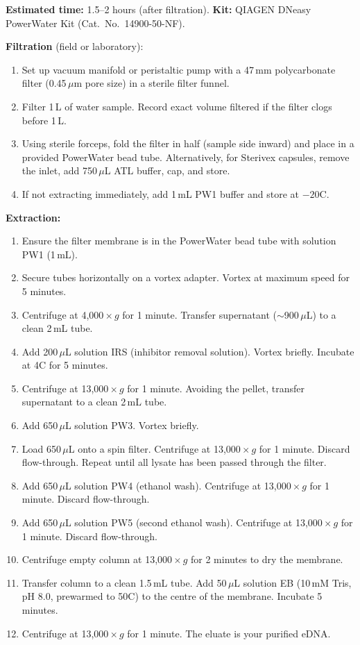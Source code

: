\begin{protocolbox}[title={Protocol: eDNA Extraction from Water (DNeasy PowerWater Kit)}]
\textbf{Estimated time:} 1.5--2 hours (after filtration). \textbf{Kit:} QIAGEN DNeasy PowerWater Kit (Cat.\ No.\ 14900-50-NF).

\textbf{Filtration} (field or laboratory):
\begin{enumerate}[nosep]
  \item Set up vacuum manifold or peristaltic pump with a 47\,mm polycarbonate filter (0.45\,$\mu$m pore size) in a sterile filter funnel.
  \item Filter 1\,L of water sample. Record exact volume filtered if the filter clogs before 1\,L.
  \item Using sterile forceps, fold the filter in half (sample side inward) and place in a provided PowerWater bead tube. Alternatively, for Sterivex capsules, remove the inlet, add 750\,$\mu$L ATL buffer, cap, and store.
  \item If not extracting immediately, add 1\,mL PW1 buffer and store at $-20$\textdegree C.
\end{enumerate}

\textbf{Extraction:}
\begin{enumerate}[nosep]
  \item Ensure the filter membrane is in the PowerWater bead tube with solution PW1 (1\,mL).
  \item Secure tubes horizontally on a vortex adapter. Vortex at maximum speed for 5 minutes.
  \item Centrifuge at 4,000\,$\times$\,$g$ for 1 minute. Transfer supernatant ($\sim$900\,$\mu$L) to a clean 2\,mL tube.
  \item Add 200\,$\mu$L solution IRS (inhibitor removal solution). Vortex briefly. Incubate at 4\textdegree C for 5 minutes.
  \item Centrifuge at 13,000\,$\times$\,$g$ for 1 minute. Avoiding the pellet, transfer supernatant to a clean 2\,mL tube.
  \item Add 650\,$\mu$L solution PW3. Vortex briefly.
  \item Load 650\,$\mu$L onto a spin filter. Centrifuge at 13,000\,$\times$\,$g$ for 1 minute. Discard flow-through. Repeat until all lysate has been passed through the filter.
  \item Add 650\,$\mu$L solution PW4 (ethanol wash). Centrifuge at 13,000\,$\times$\,$g$ for 1 minute. Discard flow-through.
  \item Add 650\,$\mu$L solution PW5 (second ethanol wash). Centrifuge at 13,000\,$\times$\,$g$ for 1 minute. Discard flow-through.
  \item Centrifuge empty column at 13,000\,$\times$\,$g$ for 2 minutes to dry the membrane.
  \item Transfer column to a clean 1.5\,mL tube. Add 50\,$\mu$L solution EB (10\,mM Tris, pH 8.0, prewarmed to 50\textdegree C) to the centre of the membrane. Incubate 5 minutes.
  \item Centrifuge at 13,000\,$\times$\,$g$ for 1 minute. The eluate is your purified eDNA.
\end{enumerate}


\end{protocolbox}
